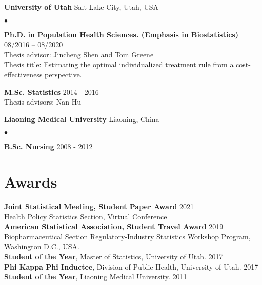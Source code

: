 \documentclass[margin,line]{res}
\newenvironment{list2}{
  \begin{list}{$\bullet$}{%
      \setlength{\itemsep}{0in}
      \setlength{\parsep}{0in} \setlength{\parskip}{0in}
      \setlength{\topsep}{0in} \setlength{\partopsep}{0in}
      \setlength{\leftmargin}{0.2in}}}{\end{list}}
\begin{document}
\begin{resume}
{\bf {University of Utah}} \hfill  {Salt Lake City, Utah, USA}\\
\vspace*{-.14in}
\begin{list2}
\item
\textbf{Ph.D. in Population Health Sciences. (Emphasis in Biostatistics)} \hfill  08/2016 -- 08/2020\\
Thesis advisor: Jincheng Shen and Tom Greene\\
Thesis title: Estimating the optimal individualized treatment rule from a cost-effectiveness perspective.
\item \textbf{M.Sc. Statistics} \hfill 2014 - 2016\\
Thesis advisors: Nan Hu 
\end{list2}

{\bf {Liaoning Medical University}} \hfill  {Liaoning, China}\\
\vspace*{-.14in}
\begin{list2}
\item \textbf{B.Sc. Nursing} \hfill 2008 - 2012\\
\end{list2}


\section{\sc Awards}
\textbf{Joint Statistical Meeting, Student Paper Award} \hfill 2021\\
Health Policy Statistics Section, Virtual Conference \\
\textbf{American Statistical Association, Student Travel Award} \hfill 2019\\
Biopharmaceutical Section Regulatory-Industry Statistics Workshop Program, Washington D.C., USA.  \\
\textbf{Student of the Year}, Master of Statistics, University of Utah. \hfill 2017\\
\textbf{Phi Kappa Phi Inductee}, Division of Public Health, University of Utah. \hfill 2017 \\
\textbf{Student of the Year}, Liaoning Medical University. \hfill 2011\\


\end{resume}
\end{document}
